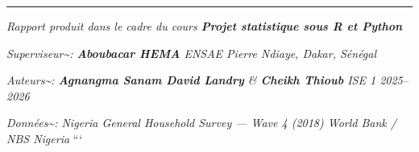 \documentclass[
]{article}
\begin{document}
\begin{center}\rule{0.5\linewidth}{0.5pt}\end{center}

\vfill

\emph{Rapport produit dans le cadre du cours
\textbf{Projet statistique sous R et Python}}

\emph{Superviseur\textasciitilde: \textbf{Aboubacar HEMA} \textbar{}
ENSAE Pierre Ndiaye, Dakar, Sénégal}

\emph{Auteurs\textasciitilde: \textbf{Agnangma Sanam David Landry} \&
\textbf{Cheikh Thioub} \textbar{} ISE 1 \textbar{} 2025--2026}

\emph{Données\textasciitilde: Nigeria General Household Survey --- Wave
4 (2018) \textbar{} World Bank / NBS Nigeria} ```
\end{document}
